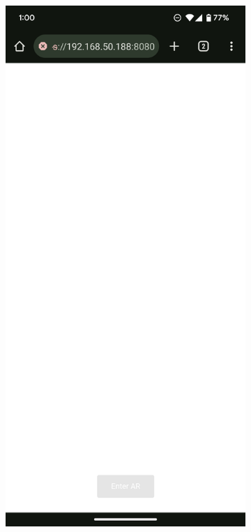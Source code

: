 \documentclass[thesis]{fputhesis}
\begin{document}
\begin{body}
\begin{figure}[h]
    \centering
    \begin{subfigure}[]{0.3\textwidth}
        \includegraphics[width=\textwidth]{Images/mainmenuv1.png}

\end{subfigure}
\end{figure}
\end{body}
\end{document}
